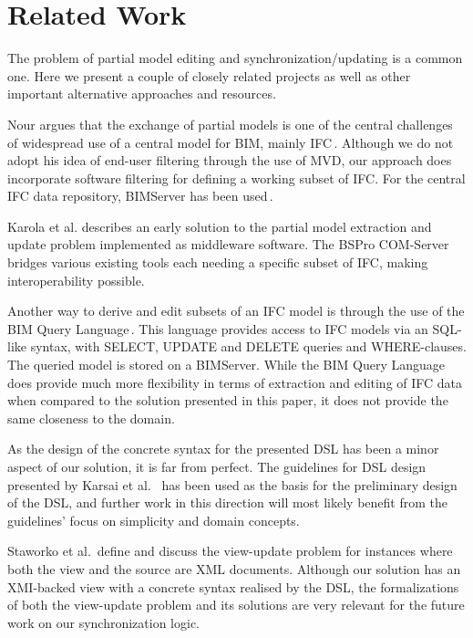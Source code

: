 \section{Related Work}
The problem of partial model editing and synchronization/updating is a common one. Here we present a couple of closely related projects as well as other important alternative approaches and resources.

Nour argues that the exchange of partial models is one of the central challenges of widespread use of a central model for BIM, mainly IFC\,\cite{nour08}. Although we do not adopt his idea of end-user filtering through the use of MVD, our approach does incorporate software filtering for defining a working subset of IFC. For the central IFC data repository, BIMServer has been used\,\cite{beetz10}.

Karola et al. describes an early solution to the partial model extraction and update problem implemented as middleware software. The BSPro COM-Server bridges various existing tools each needing a specific subset of IFC, making interoperability possible.

Another way to derive and edit subsets of an IFC model is through the use of the BIM Query Language\,\cite{mazairac10}. This language provides access to IFC models via an SQL-like syntax, with SELECT, UPDATE and DELETE queries and WHERE-clauses. The queried model is stored on a BIMServer. While the BIM Query Language does provide much more flexibility in terms of extraction and editing of IFC data when compared to the solution presented in this paper, it does not provide the same closeness to the domain.

As the design of the concrete syntax for the presented DSL has been a minor aspect of our solution, it is far from perfect. The guidelines for DSL design presented by Karsai et al. \,\cite{karsai09} has been used as the basis for the preliminary design of the DSL, and further work in this direction will most likely benefit from the guidelines' focus on simplicity and domain concepts.

Staworko et al.\,\cite{staworko10} define and discuss the view-update problem for instances where both the view and the source are XML documents. Although our solution has an XMI-backed view with a concrete syntax realised by the DSL, the formalizations of both the view-update problem and its solutions are very relevant for the future work on our synchronization logic.


